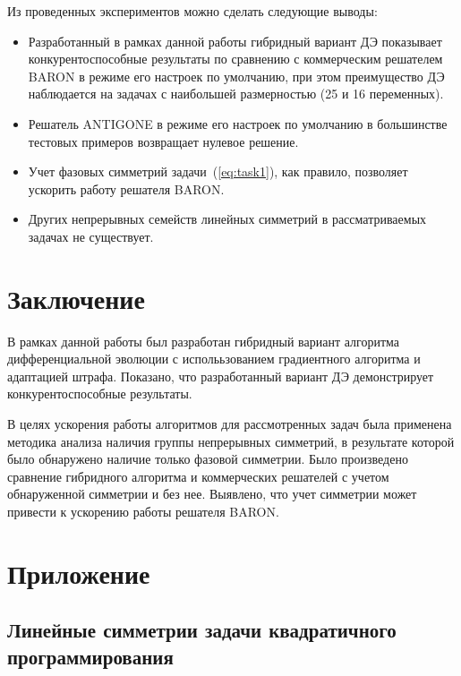 \documentclass{llncs}
\begin{document}
Из проведенных экспериментов можно сделать следующие выводы:
\begin{itemize}
  \item Разработанный в рамках данной работы гибридный вариант ДЭ показывает конкурентоспособные результаты по сравнению с коммерческим решателем BARON в режиме его настроек по умолчанию, при этом преимущество ДЭ наблюдается на задачах с наибольшей размерностью (25 и 16 переменных).
  \item Решатель ANTIGONE в режиме его настроек по умолчанию в большинстве тестовых примеров возвращает нулевое решение.
  \item Учет фазовых симметрий задачи~(\ref{eq:task1}), как правило, позволяет ускорить работу решателя BARON.
  \item Других непрерывных семейств линейных симметрий в рассматриваемых задачах не существует.
\end{itemize}

\section{Заключение}\label{sec:conclusion}

В рамках данной работы был разработан гибридный вариант алгоритма дифференциальной эволюции с исполььзованием градиентного алгоритма и адаптацией штрафа. Показано, что разработанный вариант ДЭ демонстрирует конкурентоспособные результаты.

В целях ускорения работы алгоритмов для рассмотренных задач была применена методика анализа наличия группы непрерывных симметрий, в результате которой было обнаружено наличие только фазовой симметрии. Было произведено сравнение гибридного алгоритма и коммерческих решателей с учетом обнаруженной симметрии и без нее. Выявлено, что учет симметрии может привести к ускорению работы решателя BARON.


\section*{Приложение}\label{sec:sym}
\subsection*{Линейные симметрии задачи квадратичного программирования}\label{sec:sym:mod}
\end{document}
